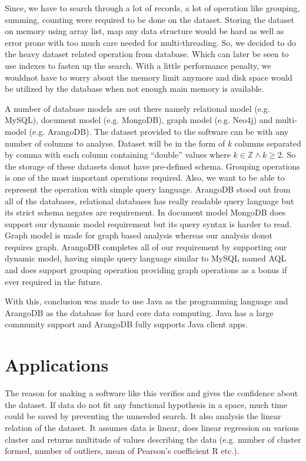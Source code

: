 Since, we have to search through a lot of records, a lot of operation like grouping, summing, counting were required to be done on the dataset. Storing the dataset on memory using array list, map any data structure would be hard as well as error prone with too much care needed for multi-threading. So, we decided to do the heavy dataset related operation from database. Which can later be seen to use indexes to fasten up the search. With a little performance penalty, we wouldnot have to worry about the memory limit anymore and disk space would be utilized by the database when not enough main memory is available. 

A number of database models are out there namely relational model (e.g. MySQL), document model (e.g. MongoDB), graph model (e.g. Neo4j) and multi-model (e.g. ArangoDB). The dataset provided to the software can be with any number of columns to analyse. Dataset will be in the form of \(k\) columns separated by comma with each column containing ``double'' values where \(k \in \mathbb{Z} \wedge k \geq 2\). So the storage of these datasets donot have pre-defined schema. Grouping operations is one of the most important operations required. Also, we want to be able to represent the operation with simple query language. ArangoDB stood out from all of the databases, relational databases has really readable query language but its strict schema negates are requirement. In document model MongoDB does support our dynamic model requirement but its query syntax is harder to read. Graph model is made for graph based analysis whereas our analysis donot requires graph. ArangoDB completes all of our requirement by supporting our dynamic model, having simple query language similar to MySQL named AQL and does support grouping operation providing graph operations as a bonus if ever required in the future.

With this, conclusion was made to use Java as the programming language and ArangoDB as the database for hard core data computing. Java has a large community support and ArangoDB fully supports Java client apps.

\section{Applications}

The reason for making a software like this verifies and gives the confidence about the dataset. If data do not fit any functional hypothesis in a space, much time could be saved by preventing the unneeded search. It also analysis the linear relation of the dataset. It assumes data is linear, does linear regression on various cluster and returns multitude of values describing the data (e.g. number of cluster formed, number of outliers, mean of Pearson's coefficient R etc.).

